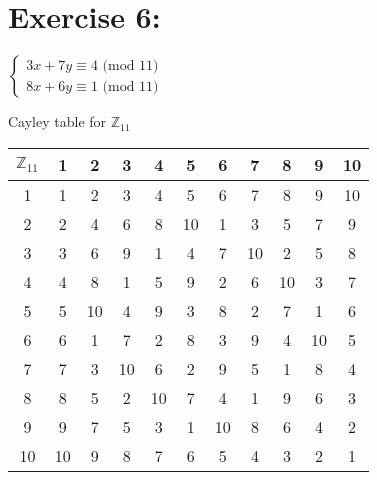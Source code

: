 \documentclass{article}
\newcommand{\Z}{\mathbb{Z}}
\begin{document}
	\section{Exercise 6:}
		\centering
		\begin{math}
			\begin{cases}
				3x + 7y \equiv 4 \mbox{ (mod 11)}\\
				8x + 6y \equiv 1 \mbox{ (mod 11)}
			\end{cases}
		\end{math}
		
		\justify
		Cayley table for $\Z_{11}$\\
		
		\centering
		\begin{tabular} {| c |c c c c c c c c c c |}
			\hline
			$\Z_{11}$ & 1 & 2 & 3 & 4 & 5 & 6 & 7 & 8 & 9 & 10 \\
			\hline
			1 & 1 & 2 & 3 & 4 & 5 & 6 & 7 & 8 & 9 & 10\\
			2 & 2 & 4 & 6 & 8 & 10 & 1 & 3 & 5 & 7 & 9\\
			3 & 3 & 6 & 9 & 1 & 4 & 7 & 10 & 2 & 5 & 8\\
			4 & 4 & 8 & 1 & 5 & 9 & 2 & 6 & 10 & 3 & 7\\
			5 & 5 & 10 & 4 & 9 & 3 & 8 & 2 & 7 & 1 & 6\\
			6 & 6 & 1 & 7 & 2 & 8 & 3 & 9 & 4 & 10 & 5\\
			7 & 7 & 3 & 10 & 6 & 2 & 9 & 5 & 1 & 8 & 4\\
			8 & 8 & 5 & 2 & 10 & 7 & 4 & 1 & 9 & 6 & 3\\
			9 & 9 & 7 & 5 & 3 & 1 & 10 & 8 & 6 & 4 & 2\\
			10 & 10 & 9 & 8 & 7 & 6 & 5 & 4 & 3 & 2 & 1\\
			\hline
		\end{tabular}
		
\end{document}
